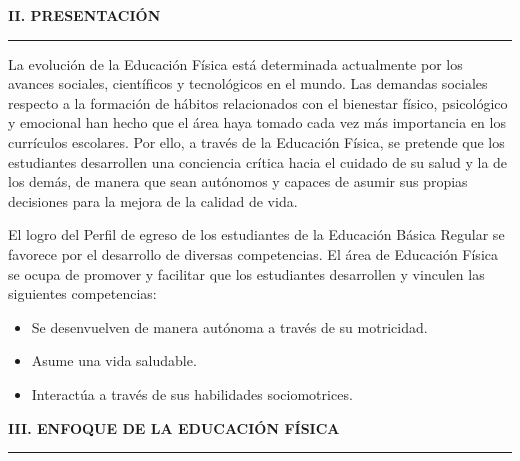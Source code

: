 \documentclass[11pt,a4paper]{article}
\begin{document}
\vspace{1.5em}
\noindent
{\color{azultexto}\bfseries\Large II. PRESENTACIÓN}\\[-0.3em]
{\color{azultexto}\rule{\textwidth}{0.6pt}}
\vspace{0.5em}
\begin{tcolorbox}[
    enhanced,
    colback=white,
    colframe=azultitulo,
    sharp corners=all,
    boxrule=0.4pt,
    left=8pt, right=8pt, top=6pt, bottom=6pt,
    borderline west={2pt}{0pt}{azultitulo},
    drop shadow southeast,
]
\justifying
La evolución de la Educación Física está determinada actualmente por los avances sociales, científicos y tecnológicos en el mundo. Las demandas sociales respecto a la formación de hábitos relacionados con el bienestar físico, psicológico y emocional han hecho que el área haya tomado cada vez más importancia en los currículos escolares. Por ello, a través de la Educación Física, se pretende que los estudiantes desarrollen una conciencia crítica hacia el cuidado de su salud y la de los demás, de manera que sean autónomos y capaces de asumir sus propias decisiones para la mejora de la calidad de vida.

\vspace{0.5em}
El logro del Perfil de egreso de los estudiantes de la Educación Básica Regular se favorece por el desarrollo de diversas competencias. El área de Educación Física se ocupa de promover y facilitar que los estudiantes desarrollen y vinculen las siguientes competencias:

\vspace{-0.5em}
\begin{itemize}
  \item Se desenvuelven de manera autónoma a través de su motricidad.
  \item Asume una vida saludable.
  \item Interactúa a través de sus habilidades sociomotrices.
\end{itemize}
\end{tcolorbox}

\vspace{1.5em}
\noindent
{\color{azultexto}\bfseries\Large III. ENFOQUE DE LA EDUCACIÓN FÍSICA}\\[-0.3em]
{\color{azultexto}\rule{\textwidth}{0.6pt}}

\end{document}
